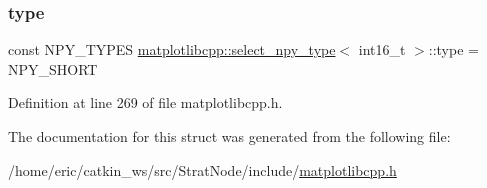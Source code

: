\subsubsection{\texorpdfstring{type}{type}}
{\footnotesize\ttfamily const N\+P\+Y\+\_\+\+T\+Y\+P\+ES \mbox{\hyperlink{structmatplotlibcpp_1_1select__npy__type}{matplotlibcpp\+::select\+\_\+npy\+\_\+type}}$<$ int16\+\_\+t $>$\+::type = N\+P\+Y\+\_\+\+S\+H\+O\+RT\hspace{0.3cm}{\ttfamily [static]}}



Definition at line 269 of file matplotlibcpp.\+h.



The documentation for this struct was generated from the following file\+:\begin{DoxyCompactItemize}
\item 
/home/eric/catkin\+\_\+ws/src/\+Strat\+Node/include/\mbox{\hyperlink{matplotlibcpp_8h}{matplotlibcpp.\+h}}\end{DoxyCompactItemize}

